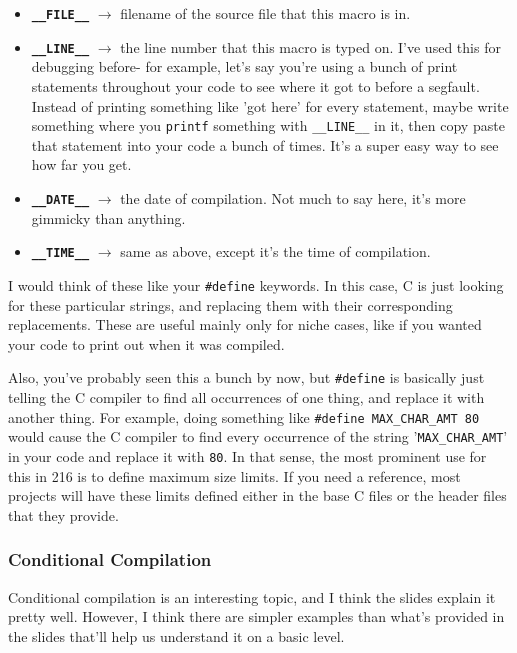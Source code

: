 \documentclass[english, 10pt]{article}
\begin{document}
\begin{itemize}
	\item \textbf{\texttt{\_\_FILE\_\_}} $\rightarrow$ filename of the source file that this macro is in.
	\item \textbf{\texttt{\_\_LINE\_\_}} $\rightarrow$ the line number that this macro is typed on. I've used this for debugging before- for example, let's say you're using a bunch of print statements throughout your code to see where it got to before a segfault. Instead of printing something like 'got here' for every statement, maybe write something where you \texttt{printf} something with \texttt{\_\_LINE\_\_} in it, then copy paste that statement into your code a bunch of times. It's a super easy way to see how far you get.
	\item \textbf{\texttt{\_\_DATE\_\_}} $\rightarrow$ the date of compilation. Not much to say here, it's more gimmicky than anything.
	\item \textbf{\texttt{\_\_TIME\_\_}} $\rightarrow$ same as above, except it's the time of compilation.
\end{itemize}

I would think of these like your \texttt{\#define} keywords. In this case, C is just looking for these particular strings, and replacing them with their corresponding replacements. These are useful mainly only for niche cases, like if you wanted your code to print out when it was compiled.\newline

Also, you've probably seen this a bunch by now, but \texttt{\#define} is basically just telling the C compiler to find all occurrences of one thing, and replace it with another thing. For example, doing something like \texttt{\#define MAX\_CHAR\_AMT 80} would cause the C compiler to find every occurrence of the string '\texttt{MAX\_CHAR\_AMT}' in your code and replace it with \texttt{80}. In that sense, the most prominent use for this in 216 is to define maximum size limits. If you need a reference, most projects will have these limits defined either in the base C files or the header files that they provide.

\subsubsection{Conditional Compilation}

Conditional compilation is an interesting topic, and I think the slides explain it pretty well. However, I think there are simpler examples than what's provided in the slides that'll help us understand it on a basic level.\newline
\end{document}
